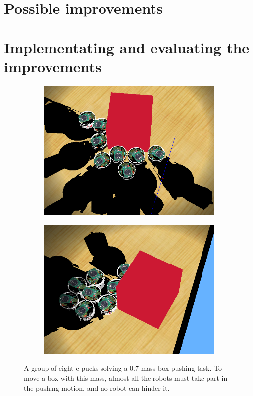 \documentclass[a4paper,10pt]{article}
\begin{document}
\section{Possible improvements}
\label{sec:b1}

\section{Implementating and evaluating the improvements}

\begin{figure}[!h]
    \centering

    \begin{subfigure}[!h]{0.45\textwidth}
        \includegraphics[width=\textwidth]{models/stresstest.PNG}
    \end{subfigure}
    \begin{subfigure}[!h]{0.45\textwidth}
        \includegraphics[width=\textwidth]{models/stresstest2.PNG}
    \end{subfigure}

    \caption{A group of eight e-pucks solving a $0.7$-mass box pushing task.
    To move a box with this mass, almost all the robots must take part in the
    pushing motion, and no robot can hinder it.}
\end{figure}


\label{sec:b2}
\end{document}
